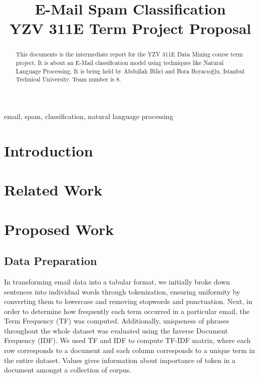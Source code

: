 \documentclass[conference]{IEEEtran}
\begin{document}
\title{E-Mail Spam Classification\\
{\Large YZV 311E Term Project Proposal}
}

\author{
\and
{}
}

\maketitle

\begin{abstract}
This documents is the intermediate report for the YZV 311E Data Mining course term project. It is about an E-Mail classification model using techniques like Natural Language Processing. It is being held by Abdullah Bilici and Bora Boyacıoğlu, Istanbul Technical University. Team number is 8.
\end{abstract}

\begin{IEEEkeywords}
email, spam, classification, natural language processing
\end{IEEEkeywords}

\section{Introduction}

\section{Related Work}

\section{Proposed Work}

\subsection{Data Preparation}
In transforming email data into a tabular format, we initially broke down sentences into individual words through tokenization, ensuring uniformity by converting them to lowercase and removing stopwords and punctuation. Next, in order to determine how frequently each term occurred in a particular email, the Term Frequency (TF) was computed. Additionally, uniqueness of phrases throughout the whole dataset was evaluated using the Inverse Document Frequency (IDF). We used TF and IDF to compute TF-IDF matrix, where each row corresponds to a document and each column corresponds to a unique term in the entire dataset. Values gives information about importance of token in a document amongst a collection of corpus.
\end{document}
